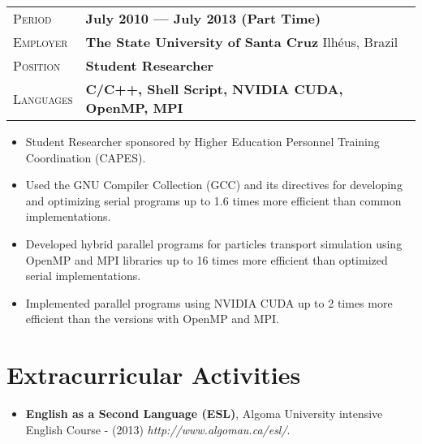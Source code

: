 \documentclass[a4paper, oneside, final]{scrartcl} %
\newcommand{\gray}{\rowcolor[gray]{.90}} %
\begin{document}
\begin{center}
\begin{itemize}
\end{itemize}

\vspace{12pt}

\begin{tabularx}{0.97\linewidth}{>{\raggedleft\scshape}p{2.2cm}X}
\gray Period & \textbf{July 2010 --- July 2013 (Part Time)}\\
\gray Employer & \textbf{The State University of Santa Cruz} \hfill Ilhéus, Brazil\\
\gray Position & \textbf{Student Researcher}\\
\gray Languages & \textbf{C/C++, Shell Script, NVIDIA CUDA, OpenMP, MPI}\\

\end{tabularx}

\begin{itemize}

\item Student Researcher sponsored by Higher Education Personnel Training Coordination (CAPES).

\item Used the GNU Compiler Collection (GCC) and its directives for developing and optimizing serial programs up to 1.6 times more efficient than common implementations.

\item Developed hybrid parallel programs for particles transport simulation using OpenMP and MPI libraries up to 16 times more efficient than optimized serial implementations.

\item Implemented parallel programs using NVIDIA CUDA up to 2 times more efficient than the versions with OpenMP and MPI.

\end{itemize}

\section{Extracurricular Activities}
\begin{itemize}

\item \textbf{English as a Second Language (ESL)}, Algoma University intensive English Course - (2013) \textit{http://www.algomau.ca/esl/}.


\end{itemize}
\end{center}
\end{document}
